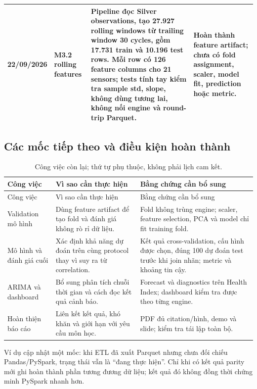 \begin{longtable}{L{2cm}L{3.2cm}L{5.8cm}L{3.3cm}}
22/09/2026 & M3.2 rolling features & Pipeline đọc Silver observations, tạo 27.927 rolling windows từ trailing window 30 cycles, gồm 17.731 train và 10.196 test rows. Mỗi row có 126 feature columns cho 21 sensors; tests tính tay kiểm tra sample std, slope, không dùng tương lai, không nối engine và round-trip Parquet. & Hoàn thành feature artifact; chưa có fold assignment, scaler, model fit, prediction hoặc metric.\\
\bottomrule
\end{longtable}

\subsection{Các mốc tiếp theo và điều kiện hoàn thành}
\begin{longtable}{L{3.4cm}L{5.1cm}L{6.2cm}}
\caption{Công việc còn lại; thứ tự phụ thuộc, không phải lịch cam kết.}\label{tab:next}\\
\toprule Công việc & Vì sao cần thực hiện & Bằng chứng cần bổ sung\\\midrule
\endfirsthead
\toprule Công việc & Vì sao cần thực hiện & Bằng chứng cần bổ sung\\\midrule
\endhead
Validation mô hình & Dùng feature artifact để tạo fold và đánh giá không rò rỉ dữ liệu. & Fold không trùng engine; scaler, feature selection, PCA và model chỉ fit training fold.\\[0.5em]
Mô hình và đánh giá cuối & Xác định khả năng dự đoán trên cùng protocol thay vì suy ra từ correlation. & Kết quả cross-validation, cấu hình được chọn, đúng 100 dự đoán test trước khi join nhãn; metric và khoảng tin cậy.\\[0.5em]
ARIMA và dashboard & Bổ sung phân tích chuỗi thời gian và cách đọc kết quả cảnh báo. & Forecast và diagnostics trên Health Index; dashboard kiểm tra được theo từng engine.\\[0.5em]
Hoàn thiện báo cáo & Liên kết kết quả, khó khăn và giới hạn với yêu cầu môn học. & PDF đủ citation/hình, demo và slide; kiểm tra tái lập toàn bộ.\\
\bottomrule
\end{longtable}

Ví dụ cập nhật một mốc: khi ETL đã xuất Parquet nhưng chưa đối chiếu Pandas/PySpark, trạng thái vẫn là ``đang thực hiện''. Chỉ khi có kết quả parity mới ghi hoàn thành phần tương đương dữ liệu; kết quả đó không đồng thời chứng minh PySpark nhanh hơn.
